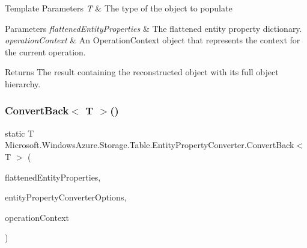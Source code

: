 \begin{DoxyTemplParams}{Template Parameters}
{\em T} & The type of the object to populate\\
\hline
\end{DoxyTemplParams}

\begin{DoxyParams}{Parameters}
{\em flattened\+Entity\+Properties} & The flattened entity property dictionary.\\
\hline
{\em operation\+Context} & An Operation\+Context object that represents the context for the current operation.\\
\hline
\end{DoxyParams}
\begin{DoxyReturn}{Returns}
The result containing the reconstructed object with its full object hierarchy.
\end{DoxyReturn}
\mbox{\label{classMicrosoft_1_1WindowsAzure_1_1Storage_1_1Table_1_1EntityPropertyConverter_a3beb7c8638a8f6a84bd16c0f0a00521d_a3beb7c8638a8f6a84bd16c0f0a00521d}} 
\subsubsection{\texorpdfstring{Convert\+Back$<$ T $>$()}{ConvertBack< T >()}\hspace{0.1cm}{\footnotesize\ttfamily [2/2]}}
{\footnotesize\ttfamily static T Microsoft.\+Windows\+Azure.\+Storage.\+Table.\+Entity\+Property\+Converter.\+Convert\+Back$<$ T $>$ (\begin{DoxyParamCaption}\item[{I\+Dictionary$<$ string, Entity\+Property $>$}]{flattened\+Entity\+Properties,  }\item[{Entity\+Property\+Converter\+Options}]{entity\+Property\+Converter\+Options,  }\item[{Operation\+Context}]{operation\+Context }\end{DoxyParamCaption})\hspace{0.3cm}{\ttfamily [static]}}



